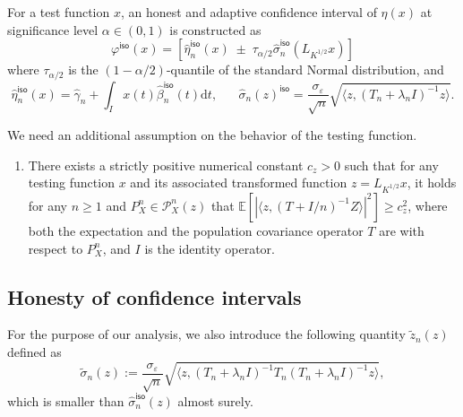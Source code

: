 \documentclass[11pt,a4paper]{article}
\renewcommand{\hat}{\widehat}
\renewcommand{\tilde}{\widetilde}
\theoremstyle{definition}
\theoremstyle{plain}
\theoremstyle{remark}
\newcommand{\supp}{\mathrm{supp}}
\newcommand{\mX}{\mathcal X}
\newcommand{\ud}{\mathrm d}
\newcommand{\iso}{\mathsf{iso}}
\begin{document}
For a test function $x$, an honest and adaptive confidence interval of $\eta(x)$ at significance level $\alpha\in(0,1)$ is constructed as
$$
\varphi^\iso(x) = [\hat\eta_n^\iso(x)\;\pm\;\tau_{\alpha/2}\hat\sigma_n^\iso(L_{K^{1/2}}x)]
$$
where $\tau_{\alpha/2}$ is the $(1-\alpha/2)$-quantile of the standard Normal distribution, and
$$
\hat\eta_n^\iso(x) = \hat\gamma_n + \int_I x(t)\hat\beta_n^\iso(t)\ud t,\;\;\;\;\;\;\hat\sigma_n(z)^\iso = \frac{\sigma_\varepsilon}{\sqrt{n}}\sqrt{\langle z, (T_n+\lambda_n I)^{-1}z\rangle}.
$$

{\color{cyan}
We need an additional assumption on the behavior of the testing function.
\begin{enumerate}
    \item[(B4)] There exists a strictly positive numerical constant $c_z>0$ such that for any testing function $x$ and its associated transformed function $z=L_{K^{1/2}}x$, it holds for any $n\geq 1$ and $P_X^n\in\mathcal P_X^n(z)$ that $\mathbb E[|\langle z, (T+I/n)^{-1} Z\rangle|^2]\geq c_z^2$, where both the expectation and the population covariance operator $T$ are with respect to $P_X^n$, and $I$ is the identity operator.
\end{enumerate}
}

\subsection{Honesty of confidence intervals}

For the purpose of our analysis, 
we also introduce the following quantity $\tilde z_n(z)$ defined as
$$
\tilde\sigma_n(z) := \frac{\sigma_\varepsilon}{\sqrt{n}}\sqrt{\langle z, (T_n+\lambda_n I)^{-1}T_n(T_n+\lambda_n I)^{-1}z\rangle},
$$
which is smaller than $\hat\sigma_n^\iso(z)$ almost surely.

\end{document}

